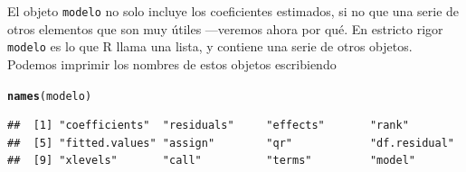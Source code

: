 \documentclass{report}\usepackage[]{graphicx}\usepackage[]{color}
\makeatletter
\newcommand{\hlstd}[1]{\textcolor[rgb]{0.345,0.345,0.345}{#1}}%
\newcommand{\hlkwd}[1]{\textcolor[rgb]{0.737,0.353,0.396}{\textbf{#1}}}%
\newenvironment{kframe}{%
 \def\at@end@of@kframe{}%
 \ifinner\ifhmode%
  \def\at@end@of@kframe{\end{minipage}}%
  \begin{minipage}{\columnwidth}%
 \fi\fi%
 \def\FrameCommand##1{\hskip\@totalleftmargin \hskip-\fboxsep
 \colorbox{shadecolor}{##1}\hskip-\fboxsep
     \hskip-\linewidth \hskip-\@totalleftmargin \hskip\columnwidth}%
 \MakeFramed {\advance\hsize-\width
   \@totalleftmargin\z@ \linewidth\hsize
   \@setminipage}}%
 {\par\unskip\endMakeFramed%
 \at@end@of@kframe}
\newenvironment{knitrout}{}{} %
\makeatother
\begin{document}
El objeto \verb|modelo| no solo incluye los coeficientes estimados, si no que una serie de otros elementos que son muy útiles ---veremos ahora por qué. En estricto rigor \verb|modelo| es lo que R llama una lista, y contiene una serie de otros objetos. Podemos imprimir los nombres de estos objetos escribiendo
\begin{knitrout}
\color{fgcolor}\begin{kframe}
\begin{alltt}
\hlkwd{names}\hlstd{(modelo)}
\end{alltt}
\begin{verbatim}
##  [1] "coefficients"  "residuals"     "effects"       "rank"         
##  [5] "fitted.values" "assign"        "qr"            "df.residual"  
##  [9] "xlevels"       "call"          "terms"         "model"
\end{verbatim}
\end{kframe}
\end{knitrout}
\end{document}
